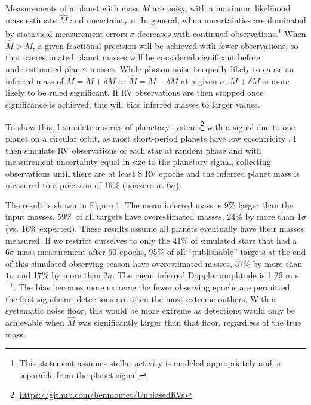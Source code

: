 \documentclass[rnaas]{aastex62}
\begin{document}
Measurements of a planet with mass $M$ are noisy, with a maximum likelihood mass estimate $\hat{M}$ and uncertainty $\sigma$.
In general,
when uncertainties are dominated by statistical measurement errors $\sigma$ 
decreases with continued observations.\footnote{This statement assumes stellar activity is modeled appropriately
and is separable from the planet signal.} When $\hat{M} > M$, a given fractional
precision will be achieved with fewer observations, so that overestimated planet masses will be considered significant before underestimated planet masses. While photon noise is equally likely to cause an inferred mass of $\hat{M} = M + \delta M$ or $\hat{M} = M - \delta M$ at a given $\sigma$, $M + \delta M$ is more likely to be ruled significant. If RV observations are then stopped once significance is
achieved, this will bias inferred masses to larger values.

To show this, I simulate a series of planetary systems\footnote{\url{https://github.com/benmontet/UnbiasedRVs}} with a signal due to one planet
on a circular orbit, as most short-period planets have low eccentricity \citep{Shabram16}. I then simulate RV observations of each star at random phase and with measurement uncertainty equal in size to the planetary signal, collecting observations until there are at least 8 RV epochs and the inferred planet mass is measured to a precision of 16\% (nonzero at $6\sigma$). 


The result is shown in Figure 1. The mean inferred mass is 9\% larger than
the input masses. 59\% of all targets have overestimated masses, 24\% by more 
than 1$\sigma$ (vs. 16\% expected). 
These results assume all planets eventually have their masses measured. 
If we restrict ourselves to only the 41\% of simulated stars that had a $6\sigma$ mass measurement
after 60 epochs, 95\% of all ``publishable'' targets at the end of this simulated observing season have overestimated masses, 57\% by more than $1\sigma$
and 17\% by more than $2\sigma$. The mean inferred Doppler amplitude is 1.29 m s$^{-1}$.
The bias becomes more extreme the fewer observing epochs are permitted; the first significant detections are often the most extreme outliers.
With a systematic noise floor, this would be more extreme as detections would only be achievable when $\hat{M}$ was significantly larger than that floor, regardless of the true mass.
\end{document}
